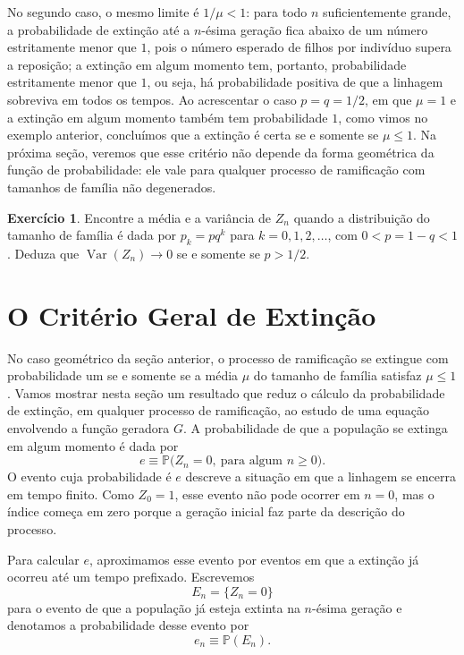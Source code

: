 \documentclass[12pt,portuguese]{article}
\theoremstyle{definition}
\theoremstyle{plainexercise}
\newtheorem{exercise}{Exercício}
\theoremstyle{starredexercise}
\theoremstyle{definition}
\begin{document}
No segundo caso, o mesmo limite é $1/\mu<1$: para todo $n$ suficientemente grande, a
probabilidade de extinção até a $n$-ésima geração fica abaixo de um número
estritamente menor que $1$, pois o número esperado de filhos por indivíduo supera a
reposição; a extinção em algum momento tem, portanto, probabilidade estritamente menor que $1$,
ou seja, há probabilidade positiva de que a linhagem sobreviva em todos os tempos.
Ao acrescentar o caso $p=q=1/2$, em que $\mu=1$ e a extinção em algum momento
também tem probabilidade $1$, como vimos no exemplo anterior, concluímos
que a extinção é certa se e somente se $\mu\leqslant 1$.
Na próxima seção, veremos que esse critério não depende da forma geométrica da função de
probabilidade: ele vale para qualquer processo de ramificação com tamanhos de
família não degenerados.

\begin{exercise}\label{exercise:media-variancia-geometrica}
Encontre a média e a variância de $Z_n$ quando a distribuição do tamanho de
família é dada por $p_k=pq^k$ para $k=0,1,2,\ldots$, com $0<p=1-q<1$. Deduza
que $\operatorname{Var}(Z_n)\to 0$ se e somente se $p>1/2$.
\end{exercise}

\section{O Critério Geral de Extinção}\label{sec:extincao}

No caso geométrico da seção anterior, o processo de ramificação se extingue
com probabilidade um se e somente se a média $\mu$ do tamanho de família
satisfaz $\mu\leqslant 1$. Vamos mostrar nesta seção um resultado que
reduz o cálculo da probabilidade de extinção, em qualquer processo de
ramificação, ao estudo de uma equação envolvendo a função geradora $G$.
A probabilidade de que a população se extinga em algum momento é dada por
\begin{equation}\label{eq:definicao-extincao}
e\equiv \mathbb{P}\bigl(Z_n=0, \ \text{para algum } n\geqslant 0\bigr).
\end{equation}
O evento cuja probabilidade é $e$ descreve a situação em que a linhagem
se encerra em tempo finito. Como $Z_0=1$, esse evento não
pode ocorrer em $n=0$, mas o índice começa em zero porque a geração inicial
faz parte da descrição do processo.

Para calcular $e$, aproximamos esse evento por eventos em que a extinção
já ocorreu até um tempo prefixado. Escrevemos
\[
E_n=\{Z_n=0\}
\]
para o evento de que a população já esteja extinta na $n$-ésima geração e
denotamos a probabilidade desse evento por
\[
e_n\equiv \mathbb{P}(E_n).
\]
\end{document}
